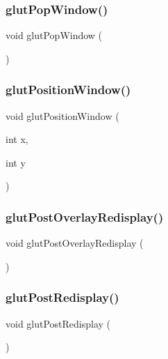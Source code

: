 \subsubsection{\texorpdfstring{glut\+Pop\+Window()}{glutPopWindow()}}
{\footnotesize\ttfamily void glut\+Pop\+Window (\begin{DoxyParamCaption}{ }\end{DoxyParamCaption})\hspace{0.3cm}{\ttfamily [inline]}}

\mbox{\label{glut_8_h_ad477f69b70f985ad8276d3ab82efb7d2}} 
\subsubsection{\texorpdfstring{glut\+Position\+Window()}{glutPositionWindow()}}
{\footnotesize\ttfamily void glut\+Position\+Window (\begin{DoxyParamCaption}\item[{int}]{x,  }\item[{int}]{y }\end{DoxyParamCaption})\hspace{0.3cm}{\ttfamily [inline]}}

\mbox{\label{glut_8_h_a64dafbbc4635e387dff31641ae25ee97}} 
\subsubsection{\texorpdfstring{glut\+Post\+Overlay\+Redisplay()}{glutPostOverlayRedisplay()}}
{\footnotesize\ttfamily void glut\+Post\+Overlay\+Redisplay (\begin{DoxyParamCaption}{ }\end{DoxyParamCaption})\hspace{0.3cm}{\ttfamily [inline]}}

\mbox{\label{glut_8_h_abdeec7ab56e4bbe848feefe0308d2bf6}} 
\subsubsection{\texorpdfstring{glut\+Post\+Redisplay()}{glutPostRedisplay()}}
{\footnotesize\ttfamily void glut\+Post\+Redisplay (\begin{DoxyParamCaption}{ }\end{DoxyParamCaption})\hspace{0.3cm}{\ttfamily [inline]}}

